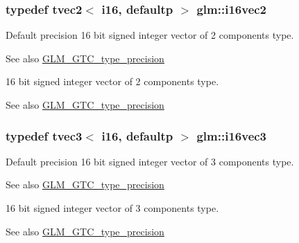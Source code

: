 \subsubsection[{i16vec2}]{\setlength{\rightskip}{0pt plus 5cm}typedef tvec2$<$ i16, defaultp $>$ {\bf glm\+::i16vec2}}\label{group__gtc__type__precision_ga37af364ff13fb791571dd324dfd3ca89}
Default precision 16 bit signed integer vector of 2 components type. \begin{DoxySeeAlso}{See also}
\hyperlink{group__gtc__type__precision}{G\+L\+M\+\_\+\+G\+T\+C\+\_\+type\+\_\+precision}
\end{DoxySeeAlso}
16 bit signed integer vector of 2 components type. \begin{DoxySeeAlso}{See also}
\hyperlink{group__gtc__type__precision}{G\+L\+M\+\_\+\+G\+T\+C\+\_\+type\+\_\+precision} 
\end{DoxySeeAlso}
\hypertarget{group__gtc__type__precision_ga85e903f028d903b416a1119b00af57ea}{}
\subsubsection[{i16vec3}]{\setlength{\rightskip}{0pt plus 5cm}typedef tvec3$<$ i16, defaultp $>$ {\bf glm\+::i16vec3}}\label{group__gtc__type__precision_ga85e903f028d903b416a1119b00af57ea}
Default precision 16 bit signed integer vector of 3 components type. \begin{DoxySeeAlso}{See also}
\hyperlink{group__gtc__type__precision}{G\+L\+M\+\_\+\+G\+T\+C\+\_\+type\+\_\+precision}
\end{DoxySeeAlso}
16 bit signed integer vector of 3 components type. \begin{DoxySeeAlso}{See also}
\hyperlink{group__gtc__type__precision}{G\+L\+M\+\_\+\+G\+T\+C\+\_\+type\+\_\+precision} 
\end{DoxySeeAlso}
\hypertarget{group__gtc__type__precision_gaf074450c0e60b45114084b1df4012a1d}{}
